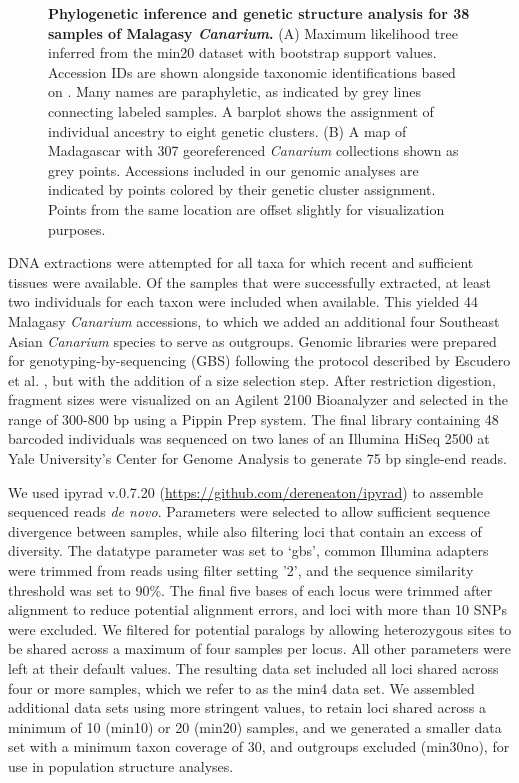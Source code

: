 \documentclass[10pt,letterpaper]{article}
\begin{document}
\begin{figure}[!h]
  \caption{{\bf Phylogenetic inference and genetic structure analysis for 38 samples of Malagasy \emph{Canarium}.}
    (A) Maximum likelihood tree inferred from the min20 dataset with bootstrap support values. Accession IDs are shown alongside taxonomic identifications based on \cite{daly_revision_2015}. Many names are paraphyletic, as indicated by grey lines connecting labeled samples. A barplot shows the assignment of individual ancestry to eight genetic clusters. (B) A map of Madagascar with 307 georeferenced \emph{Canarium} collections shown as grey points. Accessions included in our genomic analyses are indicated by points colored by their genetic cluster assignment. Points from the same location are offset slightly for visualization purposes.}
  \label{fig:fig1}
\end{figure}


DNA extractions were attempted for all taxa for which recent and sufficient tissues were available. Of the samples that were successfully extracted, at least two individuals for each taxon were included when available. This yielded 44 Malagasy \emph{Canarium} accessions, to which we added an additional four Southeast Asian \emph{Canarium} species to serve as outgroups. Genomic libraries were prepared for genotyping-by-sequencing (GBS) following the protocol described by Escudero et al. \cite{escudero_genotyping-by-sequencing_2014}, but with the addition of a size selection step. After restriction digestion, fragment sizes were visualized on an Agilent 2100 Bioanalyzer and selected in the range of 300-800 bp using a Pippin Prep system. The final library containing 48 barcoded individuals was sequenced on two lanes of an Illumina HiSeq 2500 at Yale University’s Center for Genome Analysis %
to generate 75 bp single-end reads.

We used ipyrad v.0.7.20 \cite{eaton_pyrad:_2014} (\url{https://github.com/dereneaton/ipyrad}) to assemble sequenced reads \emph{de novo}. Parameters were selected to allow sufficient sequence divergence between samples, while also filtering loci that contain an excess of diversity. The datatype parameter was set to ‘gbs’, common Illumina adapters were trimmed from reads using filter setting '2', and the sequence similarity threshold was set to 90\%. The final five bases of each locus were trimmed after alignment to reduce potential alignment errors, and loci with more than 10 SNPs were excluded. We filtered for potential paralogs by allowing heterozygous sites to be shared across a maximum of four samples per locus. All other parameters were left at their default values. The resulting data set included all loci shared across four or more samples, which we refer to as the min4 data set. We assembled additional data sets using more stringent values, to retain loci shared across a minimum of 10 (min10) or 20 (min20) samples, and we generated a smaller data set with a  minimum taxon coverage of 30, and outgroups excluded (min30no), for use in population structure analyses.
\end{document}
